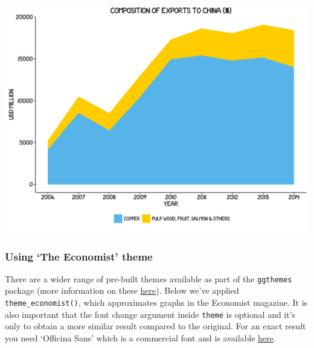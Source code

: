 \documentclass[]{article}
\begin{document}
\begin{center}\includegraphics{0_all_posts_pdf/area_8-1} \end{center}

\subsubsection{\texorpdfstring{Using `The Economist'
theme}{Using The Economist theme}}\label{using-the-economist-theme-1}

There are a wider range of pre-built themes available as part of the
\texttt{ggthemes} package (more information on these
\href{https://cran.r-project.org/web/packages/ggthemes/vignettes/ggthemes.html}{here}).
Below we've applied \texttt{theme\_economist()}, which approximates
graphs in the Economist magazine. It is also important that the font
change argument inside \texttt{theme} is optional and it's only to
obtain a more similar result compared to the original. For an exact
result you need `Officina Sans' which is a commercial font and is
available \href{http://www.myfonts.com/fonts/itc/officina-sans/}{here}.
\end{document}
